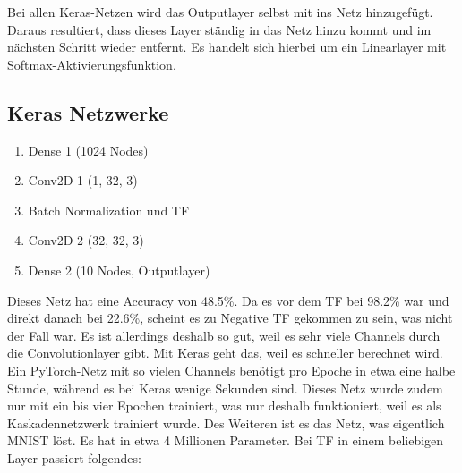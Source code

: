     Bei allen Keras-Netzen wird das Outputlayer selbst mit ins Netz hinzugefügt. Daraus 
    resultiert, dass dieses Layer ständig in das Netz hinzu kommt und im nächsten Schritt 
    wieder entfernt. Es handelt sich hierbei um ein Linearlayer mit Softmax-Aktivierungsfunktion. 

\subsection{Keras Netzwerke}
    \begin{enumerate}
        \item Dense 1 (1024 Nodes)
        \item Conv2D 1 (1, 32, 3)
        \item Batch Normalization und TF
        \item Conv2D 2 (32, 32, 3)
        \item Dense 2 (10 Nodes, Outputlayer)
    \end{enumerate}
    Dieses Netz hat eine Accuracy von 48.5\%. Da es vor dem TF bei 98.2\% war und direkt danach 
    bei 22.6\%, scheint es zu Negative TF gekommen zu sein, was nicht der Fall war. 
    Es ist allerdings deshalb so gut, weil es sehr viele 
    Channels durch die Convolutionlayer gibt. Mit Keras geht das, weil es schneller berechnet 
    wird. Ein PyTorch-Netz mit so vielen Channels benötigt pro Epoche in etwa eine halbe Stunde, 
    während es bei Keras wenige Sekunden sind.
    Dieses Netz wurde zudem nur mit ein bis vier Epochen trainiert, was nur deshalb funktioniert, 
    weil es als Kaskadennetzwerk trainiert wurde. Des Weiteren ist es das Netz, was eigentlich 
    MNIST löst.
    Es hat in etwa 4 Millionen Parameter.
    Bei TF in einem beliebigen Layer passiert folgendes: 

